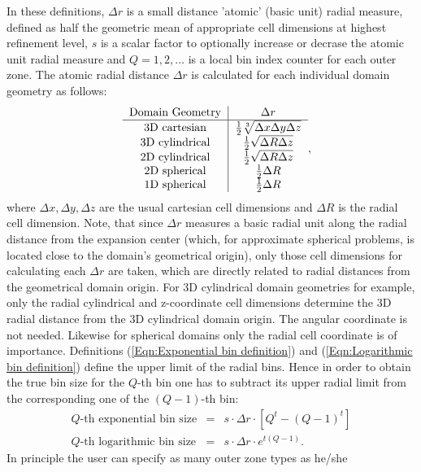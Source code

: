 In these definitions, $\Delta r$ is a small distance 'atomic' (basic unit) radial measure, defined
as half the geometric mean of appropriate cell dimensions at highest refinement level, $s$ is a scalar factor
to optionally increase or decrase the atomic unit radial measure and $Q = 1,2,\ldots$ is a local bin
index counter for each outer zone. The atomic radial distance $\Delta r$ is calculated for each individual
domain geometry as follows:
\begin{eqnarray}
&&\begin{tabular}{c|c}
Domain Geometry & $\Delta r$ \\
\hline
3D cartesian   &  ${1\over 2}\sqrt[3]{\Delta x\Delta y\Delta z}$ \\
3D cylindrical &  ${1\over 2}\sqrt{\Delta R\Delta z}$ \\
2D cylindrical &  ${1\over 2}\sqrt{\Delta R\Delta z}$ \\
2D spherical   &  ${1\over 2}\Delta R$ \\
1D spherical   &  ${1\over 2}\Delta R$
\end{tabular},
\end{eqnarray}
where $\Delta x,\Delta y,\Delta z$ are the usual cartesian cell dimensions and $\Delta R$ is
the radial cell dimension. Note, that since $\Delta r$ measures a basic radial unit along the
radial distance from the expansion center (which, for approximate spherical problems, is located
close to the domain's geometrical origin), only those cell dimensions for calculating each
$\Delta r$ are taken, which are directly related to radial distances from the geometrical domain origin.
For 3D cylindrical domain geometries for example, only the radial cylindrical and z-coordinate
cell dimensions determine the 3D radial distance from the 3D cylindrical domain origin. The
angular coordinate is not needed. Likewise for spherical domains only the radial cell coordinate
is of importance. Definitions (\ref{Eqn:Exponential bin definition}) and
(\ref{Eqn:Logarithmic bin definition}) define the upper limit of the radial bins. Hence in order to
obtain the true bin size for the $Q$-th bin one has to subtract its upper radial limit from the
corresponding one of the $(Q-1)$-th bin:
\begin{eqnarray}
\mbox{$Q$-th exponential bin size} & = & s\cdot \Delta r \cdot \left[Q^t-(Q-1)^t\right] \\
\mbox{$Q$-th logarithmic bin size} & = & s\cdot \Delta r \cdot e^{t(Q-1)}.
\end{eqnarray}
In principle the user can specify as many outer zone types as he/she
